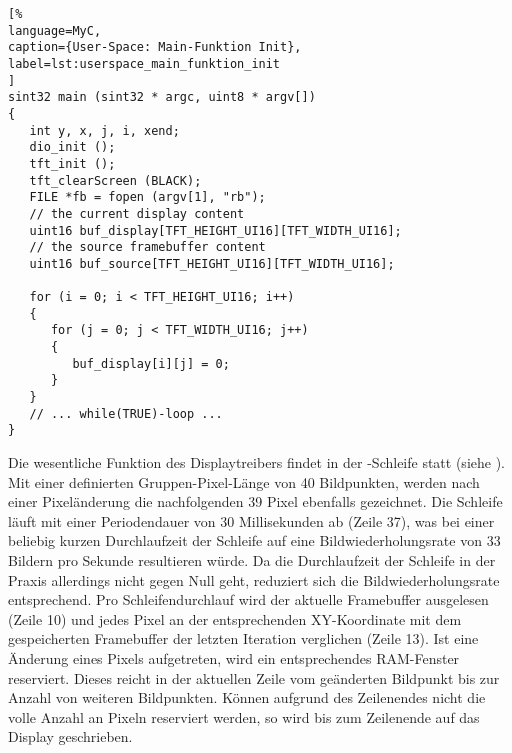 \begin{lstlisting}[%
language=MyC,
caption={User-Space: Main-Funktion Init},
label=lst:userspace_main_funktion_init
]
sint32 main (sint32 * argc, uint8 * argv[])
{
   int y, x, j, i, xend;
   dio_init ();
   tft_init ();
   tft_clearScreen (BLACK);	   
   FILE *fb = fopen (argv[1], "rb");
   // the current display content
   uint16 buf_display[TFT_HEIGHT_UI16][TFT_WIDTH_UI16];
   // the source framebuffer content   
   uint16 buf_source[TFT_HEIGHT_UI16][TFT_WIDTH_UI16];

   for (i = 0; i < TFT_HEIGHT_UI16; i++)
   {
      for (j = 0; j < TFT_WIDTH_UI16; j++)
      {
         buf_display[i][j] = 0;
      }
   }
   // ... while(TRUE)-loop ...
}
\end{lstlisting}
Die wesentliche Funktion des Displaytreibers findet in der -Schleife statt (siehe ). Mit einer definierten Gruppen-Pixel-Länge  von 40 Bildpunkten, werden nach einer Pixeländerung die nachfolgenden 39 Pixel ebenfalls gezeichnet. Die Schleife läuft mit einer Periodendauer von 30 Millisekunden ab (Zeile 37), was bei einer  beliebig kurzen Durchlaufzeit der Schleife auf eine Bildwiederholungsrate von 33 Bildern pro Sekunde resultieren würde. Da die Durchlaufzeit der Schleife in der Praxis allerdings nicht gegen Null geht, reduziert sich die Bildwiederholungsrate entsprechend. Pro Schleifendurchlauf wird der aktuelle Framebuffer ausgelesen (Zeile 10) und jedes Pixel an der entsprechenden XY-Koordinate mit dem gespeicherten Framebuffer der letzten Iteration verglichen (Zeile 13). Ist eine Änderung eines Pixels aufgetreten, wird ein entsprechendes RAM-Fenster reserviert. Dieses reicht in der aktuellen Zeile vom geänderten Bildpunkt bis zur Anzahl von  weiteren Bildpunkten. Können aufgrund des Zeilenendes nicht die volle Anzahl an Pixeln reserviert werden, so wird bis zum Zeilenende auf das Display geschrieben.

